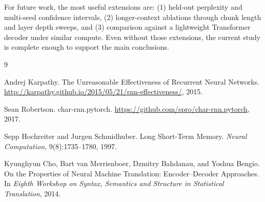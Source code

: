 \documentclass[10pt,twocolumn,letterpaper]{article}
\begin{document}
For future work, the most useful extensions are: (1) held-out perplexity and multi-seed confidence intervals, (2) longer-context ablations through chunk length and layer depth sweeps, and (3) comparison against a lightweight Transformer decoder under similar compute. Even without those extensions, the current study is complete enough to support the main conclusions.

\begin{thebibliography}{9}

Andrej Karpathy.
\newblock The Unreasonable Effectiveness of Recurrent Neural Networks.
\newblock \url{http://karpathy.github.io/2015/05/21/rnn-effectiveness/}, 2015.

Sean Robertson.
\newblock char-rnn.pytorch.
\newblock \url{https://github.com/spro/char-rnn.pytorch}, 2017.

Sepp Hochreiter and Jurgen Schmidhuber.
\newblock Long Short-Term Memory.
\newblock \emph{Neural Computation}, 9(8):1735--1780, 1997.

Kyunghyun Cho, Bart van Merrienboer, Dzmitry Bahdanau, and Yoshua Bengio.
\newblock On the Properties of Neural Machine Translation: Encoder--Decoder Approaches.
\newblock In \emph{Eighth Workshop on Syntax, Semantics and Structure in Statistical Translation}, 2014.

\end{thebibliography}
\end{document}

